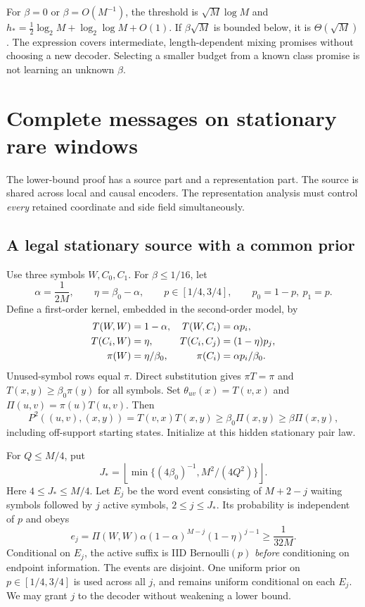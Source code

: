 \documentclass[11pt,letterpaper]{article}
\theoremstyle{definition}\newtheorem{definition}[theorem]{Definition}
\theoremstyle{remark}\newtheorem{remark}[theorem]{Remark}
\newcommand{\floor}[1]{\left\lfloor #1\right\rfloor}
\newcommand{\betaz}{\beta_0}
\begin{document}
For $\beta=0$ or $\beta=O(M^{-1})$, the threshold is $\sqrt M\log M$ and $h_*=\frac12\log_2M+\log_2\log M+O(1)$. If $\beta\sqrt M$ is bounded below, it is $\Theta(\sqrt M)$. The expression covers intermediate, length-dependent mixing promises without choosing a new decoder. Selecting a smaller budget from a known class promise is not learning an unknown $\beta$.

\section{Complete messages on stationary rare windows}\label{sec:lower}
The lower-bound proof has a source part and a representation part. The source is shared across local and causal encoders. The representation analysis must control \emph{every} retained coordinate and side field simultaneously.

\subsection{A legal stationary source with a common prior}
Use three symbols $W,C_0,C_1$. For $\beta\le1/16$, let
\[
 \alpha=\frac1{2M},\qquad \eta=\betaz-\alpha,\qquad
 p\in[1/4,3/4],\qquad p_0=1-p,\ p_1=p.
\]
Define a first-order kernel, embedded in the second-order model, by
\begin{align}\label{eq:witness}
 T(W,W)&=1-\alpha,& T(W,C_i)&=\alpha p_i,\notag\\
 T(C_i,W)&=\eta,& T(C_i,C_j)&=(1-\eta)p_j,\\
 \pi(W)&=\eta/\betaz,& \pi(C_i)&=\alpha p_i/\betaz.\notag
\end{align}
Unused-symbol rows equal $\pi$. Direct substitution gives $\pi T=\pi$ and $T(x,y)\ge\betaz\pi(y)$ for all symbols. Set $\theta_{uv}(x)=T(v,x)$ and $\Pi(u,v)=\pi(u)T(u,v)$. Then
\[
 P^2((u,v),(x,y))=T(v,x)T(x,y)\ge\betaz\Pi(x,y)\ge\beta\Pi(x,y),
\]
including off-support starting states. Initialize at this hidden stationary pair law.

For $Q\le M/4$, put
\begin{equation}\label{eq:jcut}
 J_* =\floor{\min\{(4\betaz)^{-1},M^2/(4Q^2)\}}.
\end{equation}
Here $4\le J_*\le M/4$. Let $E_j$ be the word event consisting of $M+2-j$ waiting symbols followed by $j$ active symbols, $2\le j\le J_*$. Its probability is independent of $p$ and obeys
\begin{equation}\label{eq:eventmass}
 e_j=\Pi(W,W)\alpha(1-\alpha)^{M-j}(1-\eta)^{j-1}\ge\frac1{32M}.
\end{equation}
Conditional on $E_j$, the active suffix is IID Bernoulli$(p)$ \emph{before} conditioning on endpoint information. The events are disjoint. One uniform prior on $p\in[1/4,3/4]$ is used across all $j$, and remains uniform conditional on each $E_j$. We may grant $j$ to the decoder without weakening a lower bound.
\end{document}
